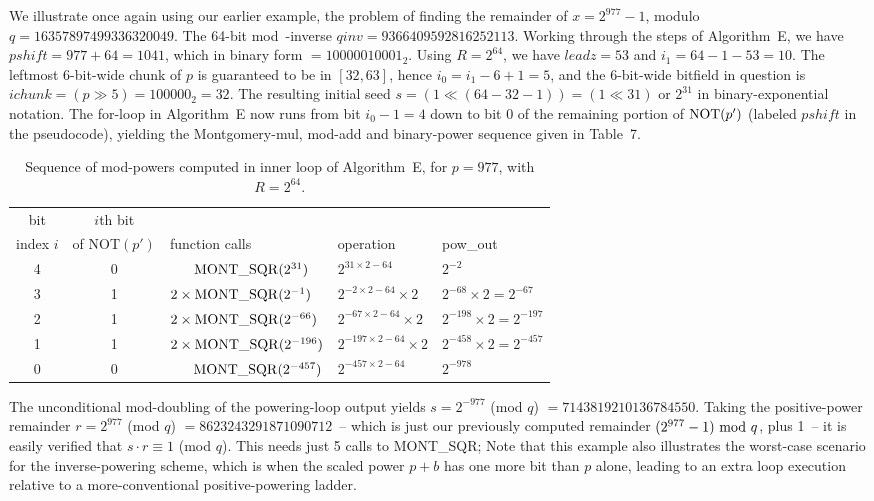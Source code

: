 \documentclass{article}
\begin{document}
We illustrate once again using our earlier example, the problem of finding the remainder of $x = 2^{977}-1$, modulo $q = 16357897499336320049$. The 64-bit mod~-inverse $qinv = 9366409592816252113$. Working through the steps of Algorithm~E, we have $pshift = 977 + 64 = 1041$, which in binary form
$= 10000010001_2$. Using $R = 2^{64}$, we have $leadz = 53$ and $i_1 = 64-1-53 = 10$. The leftmost 6-bit-wide chunk of $p$ is guaranteed to be in $[32, 63]$, hence $i_0 = i_1-6+1 = 5$, and the 6-bit-wide bitfield in question is $ichunk = (p \gg 5) = 100000_2 = 32$. The resulting initial seed $s = (1 \ll (64-32-1)) = (1 \ll 31)$ or $2^{31}$ in binary-exponential notation. The for-loop in Algorithm~E now runs from bit $i_0-1= 4$ down to bit 0 of the remaining portion of ${\rm NOT}(p')$ (labeled $pshift$ in the pseudocode), yielding the Montgomery-mul, mod-add and binary-power sequence given in Table~7.
\begin{table}[ht]
\begin{center}
\label{pow_neg}
\caption{Sequence of mod-powers computed in inner loop of Algorithm~E, for $p = 977$, with $R=2^{64}$.}
\begin{tabular}{c|c|l|l|l}
	bit		&$i$th bit	&									&								&								\\
index $i$	&of NOT$(p')$	&\qquad function calls			&	\qquad operation			&	\qquad pow\_out				\\
\hline
	4		&0		&$\ \ \ \ \ {\rm MONT\_SQR}(2^{31})		$&$2^{  31\times2 - 64}			$&$2^{  -2}						$\\
	3		&1		&$2 \times	{\rm MONT\_SQR}(2^{-1})		$&$2^{  -2\times2 - 64}\times2	$&$2^{ -68}\times2 = 2^{ -67}	$\\
	2		&1		&$2 \times	{\rm MONT\_SQR}(2^{-66})	$&$2^{ -67\times2 - 64}\times2	$&$2^{-198}\times2 = 2^{-197}	$\\
	1		&1		&$2 \times	{\rm MONT\_SQR}(2^{-196})	$&$2^{-197\times2 - 64}\times2	$&$2^{-458}\times2 = 2^{-457}	$\\
	0		&0		&$\ \ \ \ \ {\rm MONT\_SQR}(2^{-457})	$&$2^{-457\times2 - 64}			$&$2^{-978}$
\end{tabular}
\end{center}
\end{table}

\noindent The unconditional mod-doubling of the powering-loop output yields $s = 2^{-977}$ (mod $q$) $= 7143819210136784550$. Taking the positive-power remainder $r = 2^{977}$ (mod $q$) $= 8623243291871090712$~-- which is just our previously computed remainder $(2^{977} - 1)\ {\rm mod}\ q$, plus 1~-- it is easily verified that $s \cdot r \equiv 1$ (mod $q$). This needs just 5 calls to MONT\_SQR; Note that this example also illustrates the worst-case scenario for the inverse-powering scheme, which is when the scaled power $p+b$ has one more bit than $p$ alone, leading to an extra loop execution relative to a more-conventional positive-powering ladder.
\end{document}
